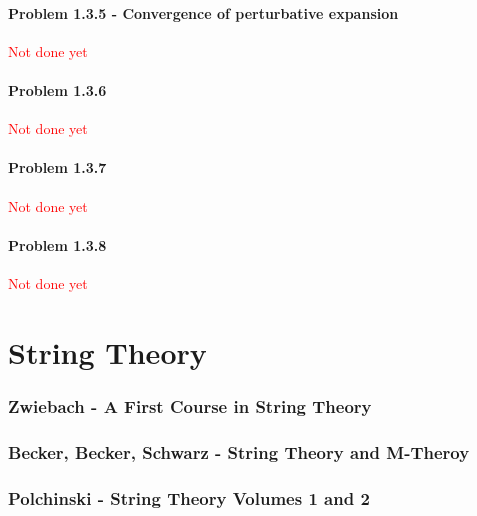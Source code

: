 \documentclass[10pt,a4paper]{book}
\theoremstyle{definition}
\begin{document}
\subsubsection{Problem 1.3.5 - Convergence of perturbative expansion}
\textcolor{red}{Not done yet}

\subsubsection{Problem 1.3.6}
\textcolor{red}{Not done yet}

\subsubsection{Problem 1.3.7}
\textcolor{red}{Not done yet}

\subsubsection{Problem 1.3.8}
\textcolor{red}{Not done yet}



\chapter{String Theory}
\subsection{{\sc Zwiebach} - A First Course in String Theory }

\subsection{{\sc Becker, Becker, Schwarz} - String Theory and M-Theroy }

\subsection{{\sc Polchinski} - String Theory Volumes 1 and 2 }
\end{document}
